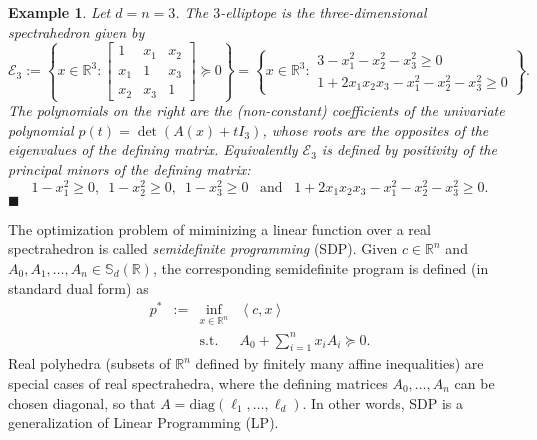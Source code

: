\documentclass[a4paper,oneside,11pt]{article}
\newtheorem{example}[theorem]{Example}
\newcommand{\R}{\mathbb{R}} %
\newcommand{\sym}{\mathbb{S}} %
\def\diag{\mathrm{diag}}
\newcommand{\exend}{\hfill $\blacksquare$}
\begin{document}
\begin{example}\label{ell3}
  Let $d=n=3$. The $3$-elliptope is the three-dimensional spectrahedron given by
  $$
  \mathcal{E}_3 :=
  \left\{
  x
  \in \R^3 :
  \begin{bmatrix}
    1 & x_1 & x_2 \\
    x_1 & 1 & x_3 \\
    x_2 & x_3 & 1
  \end{bmatrix}
  \succeq 0
  \right\}
  =
  \left\{
  x
  \in \R^3 :
  \begin{array}{r}
    3-x_1^2-x_2^2-x_3^2 \geq 0 \\
    1+2x_1x_2x_3-x_1^2-x_2^2-x_3^2 \geq 0
  \end{array}
  \right\}.
  $$
  The polynomials on the right are the (non-constant) coefficients of the univariate polynomial
  $p(t) = \det(A(x)+t I_3)$,
  whose roots are the opposites of the eigenvalues of the defining matrix. Equivalently $\mathcal{E}_3$
  is defined by positivity of the principal minors of the defining matrix:
  $$
  1-x_1^2 \geq 0, \,\,\, 1-x_2^2 \geq 0, \,\,\, 1-x_3^2 \geq 0 \,\,\, \text{ and } \,\,\, 1+2x_1x_2x_3-x_1^2-x_2^2-x_3^2 \geq 0.$$ \exend
\end{example}

The optimization problem of miminizing a linear function over a real spectrahedron is called \emph{semidefinite programming} (SDP). Given $c \in \R^n$ and $A_0,A_1,\ldots,A_n \in \sym_d(\R)$, the corresponding semidefinite program is defined (in standard dual form) as
\begin{equation}
  \label{SDP}
\begin{array}{rcll}
  p^* & := & \inf_{x \in \R^n} & \left\langle c, x \right\rangle \\
  &    & \text{s.t.}         & A_0+\sum_{i=1}^n x_i A_i \succeq 0.
\end{array}
\end{equation}
Real polyhedra (subsets of $\R^n$ defined by finitely many affine inequalities) are special cases of real
spectrahedra, where the defining matrices $A_0, \ldots, A_n$ can be chosen diagonal, so that
$A = \diag(\ell_1,\ldots, \ell_d)$. In other words, SDP is a generalization of Linear Programming (LP).

\end{document}
